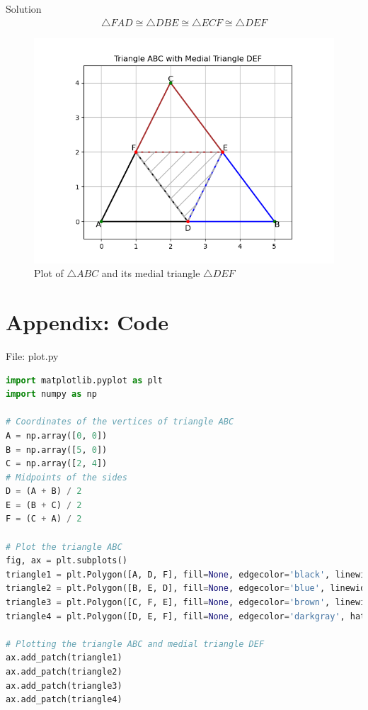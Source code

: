 \documentclass{beamer}
\numberwithin{equation}{section}
\theoremstyle{remark}
\begin{document}
\begin{frame}{Solution}
\begin{align}
    \triangle FAD \cong \triangle DBE \cong \triangle ECF \cong \triangle DEF
\end{align}
\begin{figure}[h!]
   \centering
   \includegraphics[width=0.65\linewidth]{figs/01.png}
   \caption{Plot of $\triangle ABC$ and its medial triangle $\triangle DEF$}
   \label{Plot_1}
\end{figure}
\end{frame}
\section*{Appendix: Code}
\begin{frame}[fragile]{File: plot.py}
\begin{lstlisting}[language=Python]
import matplotlib.pyplot as plt
import numpy as np

# Coordinates of the vertices of triangle ABC
A = np.array([0, 0])
B = np.array([5, 0])
C = np.array([2, 4])
# Midpoints of the sides
D = (A + B) / 2
E = (B + C) / 2
F = (C + A) / 2

# Plot the triangle ABC
fig, ax = plt.subplots()
triangle1 = plt.Polygon([A, D, F], fill=None, edgecolor='black', linewidth=2, zorder=2)
triangle2 = plt.Polygon([B, E, D], fill=None, edgecolor='blue', linewidth=2, zorder=2)
triangle3 = plt.Polygon([C, F, E], fill=None, edgecolor='brown', linewidth=2, zorder=2)
triangle4 = plt.Polygon([D, E, F], fill=None, edgecolor='darkgray', hatch='/', linestyle='--', linewidth=2, zorder=2)

# Plotting the triangle ABC and medial triangle DEF
ax.add_patch(triangle1)
ax.add_patch(triangle2)
ax.add_patch(triangle3)
ax.add_patch(triangle4)
\end{lstlisting}
\end{frame}
\end{document}
